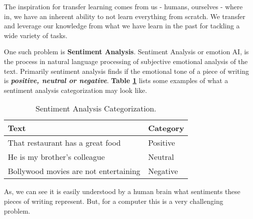 \documentclass[a4paper, 12pt]{article}
\begin{document}
\begin{sloppypar}
The inspiration for transfer learning comes from us - humans, ourselves - where in, we have an inherent ability to not learn everything from scratch. We transfer and leverage our knowledge from what we have learn in the past for tackling a wide variety of tasks.\cite{sarkar_deep_2018}

One such problem is \textbf{Sentiment Analysis}. Sentiment Analysis or emotion AI, is the process in natural language processing  of subjective emotional analysis of the text. Primarily sentiment analysis finds if the emotional tone of a piece of writing is \textbf{\textit{positive, neutral or negative}}. \textbf{Table \ref{table: category}} lists some examples of what a sentiment analysis categorization may look like.
\begin{table}[H]
\caption{ Sentiment Analysis Categorization.\label{table: category}}

\begin{tabularx}{\columnwidth}{| X | X |}
\hline
Text & Category \\ [0.5ex]
\hline
\hline
That restaurant has a great food & Positive \\ [0.5ex]
\hline
He is my brother's colleague & Neutral \\ [0.5ex]
\hline
Bollywood movies are not entertaining & Negative \\ [0.5ex]
\hline
\end{tabularx}
\end{table}

As, we can see it is easily understood by a human brain what sentiments these pieces of writing represent. But, for a computer this is a very challenging problem.

\printbibliography
\end{sloppypar}
\end{document}
